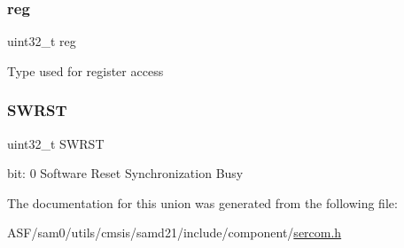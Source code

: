 \subsubsection{\texorpdfstring{reg}{reg}}
{\footnotesize\ttfamily uint32\+\_\+t reg}

Type used for register access \mbox{\label{union_s_e_r_c_o_m___s_p_i___s_y_n_c_b_u_s_y___type_a34cd956a8da179cbd5fc9060306d420e}} 
\subsubsection{\texorpdfstring{SWRST}{SWRST}}
{\footnotesize\ttfamily uint32\+\_\+t S\+W\+R\+ST}

bit\+: 0 Software Reset Synchronization Busy 

The documentation for this union was generated from the following file\+:\begin{DoxyCompactItemize}
\item 
A\+S\+F/sam0/utils/cmsis/samd21/include/component/\mbox{\hyperlink{utils_2cmsis_2samd21_2include_2component_2sercom_8h}{sercom.\+h}}\end{DoxyCompactItemize}
